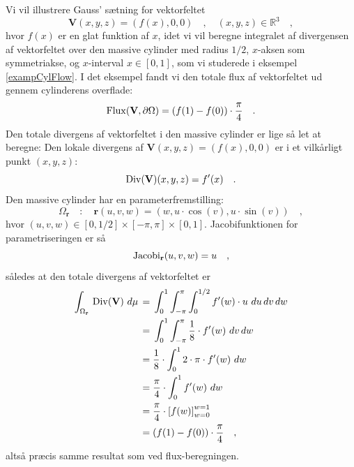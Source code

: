 \begin{example}\label{exampCylGauss}
Vi vil illustrere Gauss' sætning for vektorfeltet
\begin{equation}
\mathbf{V}(x,y,z)= (f(x), 0,0) \quad , \quad (x,y,z) \in \mathbb{R}^{3} \quad,
\end{equation}
hvor $f(x)$ er en glat funktion af $x$, idet vi vil beregne integralet af divergensen af vektorfeltet over den massive cylinder med radius $1/2$, $x$-aksen som symmetriakse, og $x$-interval $x \in [0, 1]$, som vi studerede i eksempel \ref{exampCylFlow}. I det eksempel fandt vi den totale flux af vektorfeltet ud gennem cylinderens overflade:
\begin{equation}
\operatorname{Flux}(\mathbf{V}, \partial \Omega) = (f(1) - f(0)) \cdot \frac{\pi}{4} \quad .
\end{equation}
Den totale divergens af vektorfeltet i den massive cylinder er lige så let at beregne:
Den lokale divergens af $\mathbf{V}(x,y,z) = (f(x), 0, 0)$ er i et vilkårligt punkt $(x,y,z)$:
\begin{equation}
\operatorname{Div}(\mathbf{V})(x,y,z) = f'(x) \quad .
\end{equation}
Den massive cylinder har en parameterfremstilling:
\begin{equation}
\Omega_{\mathbf{r}} \quad : \quad \mathbf{r}(u,v,w) = (w, u\cdot \cos(v), u\cdot \sin(v)) \quad ,
\end{equation}
hvor $(u,v,w) \in [0,1/2]\times [-\pi, \pi] \times [0, 1]$.
Jacobifunktionen for parametriseringen er så
\begin{equation}
\operatorname{Jacobi}_{\mathbf{r}}(u,v,w) = u \quad ,
\end{equation}
således at den totale divergens af vektorfeltet er
\begin{equation}
\begin{aligned}
\int_{\Omega_{\bf{r}}} \, \operatorname{Div}({\bf{V}}) \,\,
d\mu \, &= \, \int_{0}^{1} \int_{-\pi}^{\pi} \int_{0}^{1/2} f'(w) \cdot u \,\, du\,dv\,dw \\
&= \, \int_{0}^{1} \int_{-\pi}^{\pi} \frac{1}{8}\cdot f'(w) \,\,dv\,dw \\
&=  \frac{1}{8}\cdot \int_{0}^{1} 2\cdot \pi \cdot f'(w) \,\,dw \\
&=  \frac{\pi}{4}\cdot \int_{0}^{1} f'(w) \,\,dw \\
&=  \frac{\pi}{4}\cdot \left[f(w) \right]_{w=0}^{w=1} \\
&= (f(1) - f(0)) \cdot \frac{\pi}{4} \quad ,
\end{aligned}
\end{equation}
altså præcis samme resultat som ved flux-beregningen.
\end{example}


